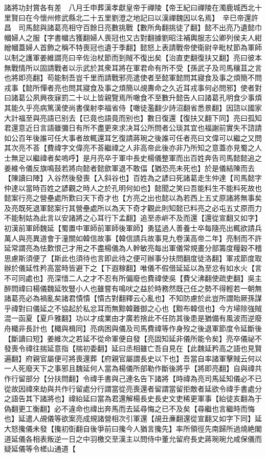 諸將功封賞各有差　八月壬申葬漢孝獻皇帝于禪陵【帝王紀曰禪陵在濁鹿城西北十里賢曰在今懷州修武縣北二十五里劉澄之地記曰以漢禪魏因以名焉】　辛巳帝還許昌　司馬懿與諸葛亮相守百餘日亮數挑戰【數所角翻挑徒了翻】懿不出亮乃遺懿巾幗婦人之服【字書幗古獲翻婦人喪冠也又古對翻據劉昭注補輿服志公卿列侯夫人紺繒幗蓋婦人首飾之稱不特喪冠也遺于季翻】懿怒上表請戰帝使衛尉辛毗杖節為軍師以制之護軍姜維謂亮曰辛佐治杖節而到賊不復出矣【治直吏翻復扶又翻】亮曰彼本無戰情所以固請戰者以示武於其衆耳將在軍君命有所不受【孫武子及司馬穰苴之言也將即亮翻】苟能制吾豈千里而請戰邪亮遣使者至懿軍懿問其寢食及事之煩簡不問戎事【懿所憚者亮也問其寢食及事之煩簡以覘夀命之久近耳戎事何必問邪】使者對曰諸葛公夙興夜寐罰二十以上皆親覽焉所噉食不至數升懿告人曰諸葛孔明食少事煩其能久乎亮病篤漢使尚書僕射李福省侍【噉徒濫翻少詩沼翻省悉景翻】因諮以國家大計福至與亮語已别去【已竟也語竟而别也】數日復還【復扶又翻下同】亮曰孤知君還意近日言語雖彌日有所不盡更來求决耳公所問者公琰其宜也福謝前實失不諮請如公百年後誰可任大事者故輒還耳乞復請蔣琬之後誰可任者亮曰文偉可以繼之又問其次亮不荅【費禕字文偉亮不荅繼禕之人非高帝此後亦非乃所知之意蓋亦見蜀之人士無足以繼禕者矣嗚呼】是月亮卒于軍中長史楊儀整軍而出百姓奔告司馬懿懿追之姜維令儀反旗鳴鼓若將向懿者懿歛軍退不敢偪【猶恐亮未死也】於是儀結陳而去【陳讀曰陣】入谷然後發喪【入斜谷也】百姓為之諺曰死諸葛走生仲達【司馬懿字仲達以當時百姓之諺觀之時人之於孔明何如也】懿聞之笑曰吾能料生不能料死故也懿案行亮之營壘處所歎曰天下奇才也【方亮之出也懿以為若西上五丈原諸將無事矣及亮既死退軍懿案行其營壘處所以為天下奇才觀此則知懿已料亮之必屯五丈原而力不能制姑為此言以安諸將之心耳行下孟翻】追至赤㟁不及而還【還從宣翻又如字】初漢前軍師魏延【蜀置中軍師前軍師後軍師】勇猛過人善養士卒每隨亮出輒欲請兵萬人與亮異道會于潼關如韓信故事【韓信請兵故事見九卷漢高帝二年】亮制而不許延常謂亮為怯歎恨己才用之不盡楊儀為人幹敏亮每出軍儀常規畫分部籌度糧穀不稽思慮斯須便了【斯此也須待也言即此待之便可辦事分扶問翻度徒洛翻】軍戎節度取辦於儀延性矜高當時皆避下之【下遐稼翻】唯儀不假借延延以為至忿有如水火【言不可同處也】亮深惜二人之才不忍有所偏廢也費禕使吳【費父沸翻使疏吏翻】吳主醉問禕曰楊儀魏延牧豎小人也雖嘗有鳴吠之益於時務然既己任之勢不得輕若一朝無諸葛亮必為禍亂矣諸君憒憒【憒古對翻釋云心亂也】不知防慮於此豈所謂貽厥孫謀乎禕對曰儀延之不協起於私忿耳而無黥韓難御之心也【黥布韓信也】今方埽除強賊混一函夏【夏戶雅翻】功以才成業由才廣若捨此不任防其後患是猶備有風波而逆廢舟檝非長計也【檝與楫同】亮病困與儀及司馬費禕等作身歿之後退軍節度令延斷後【斷讀曰短】姜維次之若延不從命軍便自發【亮固知延非儀所能令矣】亮卒儀祕不發喪令禕往揣延意指【揣初委翻】延曰丞相雖亡吾自見在【此魏延矜高之語也見賢遍翻】府親官屬便可將喪還葬【府親官屬謂長史以下也】吾當自率諸軍擊賊云何以一人死廢天下之事邪且魏延何人當為楊儀所部勒作斷後將乎【將即亮翻】自與禕共作行留部分【分扶問翻】令禕手書與己連名告下諸將【時禕為亮司馬延知儀必不已從故因禕來劫與共作行留處分行謂當從亮喪還者留謂當留拒敵者延欲令禕手書處分之語告其下諸將也】禕紿延曰當為君還解楊長史長史文吏稀更軍事【紿徒亥翻為于偽翻更工衡翻】必不違命也禕出奔馬而去延尋悔之已不及矣【尋繼也言繼時而悔也】延遣人覘儀等欲案亮成規諸營相次引軍還【覘丑亷翻還從宣翻又如字下同】延大怒攙儀未發【攙初衘翻自後爭前曰攙今人猶言攙先】率所領徑先南歸所過燒絶閣道延儀各相表叛逆一日之中羽檄交至漢主以問侍中董允留府長史蔣琬琬允咸保儀而疑延儀等令槎山通道【